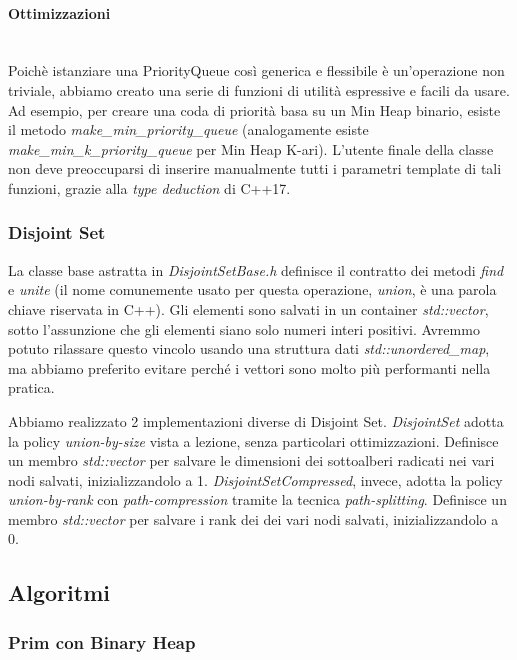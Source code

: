 \paragraph{Ottimizzazioni}\mbox{} \\

Poichè istanziare una PriorityQueue così generica e flessibile è un'operazione non triviale, abbiamo creato una serie di funzioni di utilità espressive e facili da usare. Ad esempio, per creare una coda di priorità basa su un Min Heap binario, esiste il metodo \textit{make\_min\_priority\_queue} (analogamente esiste \textit{make\_min\_k\_priority\_queue} per Min Heap K-ari).
L'utente finale della classe non deve preoccuparsi di inserire manualmente tutti i parametri template di tali funzioni, grazie alla \textit{type deduction} di C++17.

\subsubsection{Disjoint Set}

La classe base astratta in \textit{DisjointSetBase.h} definisce il contratto dei metodi \textit{find} e \textit{unite} (il nome comunemente usato per questa operazione, \textit{union}, è una parola chiave riservata in C++).
Gli elementi sono salvati in un container \textit{std::vector}, sotto l'assunzione che gli elementi siano solo numeri interi positivi.
Avremmo potuto rilassare questo vincolo usando una struttura dati \textit{std::unordered\_map}, ma abbiamo preferito evitare perché i vettori sono molto più performanti nella pratica.

Abbiamo realizzato 2 implementazioni diverse di Disjoint Set.
\textit{DisjointSet} adotta la policy \textit{union-by-size} vista a lezione, senza particolari ottimizzazioni. Definisce un membro \textit{std::vector} per salvare le dimensioni dei sottoalberi radicati nei vari nodi salvati, inizializzandolo a 1.
\textit{DisjointSetCompressed}, invece, adotta la policy \textit{union-by-rank} con \textit{path-compression} tramite la tecnica \textit{path-splitting}. Definisce un membro \textit{std::vector} per salvare i rank dei dei vari nodi salvati, inizializzandolo a 0.

\subsection{Algoritmi}

\subsubsection{Prim con Binary Heap}



